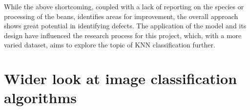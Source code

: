 While the above shortcoming, coupled with a lack of reporting on the species or processing of the beans, identifies areas for
improvement, the overall approach shows great potential in identifying defects.
The application of the model and its design have influenced the research process for this project, which,
with a more varied dataset, aims to explore the topic of KNN classification further.





\section{Wider look at image classification algorithms}
\label{sec:lit-review-general}